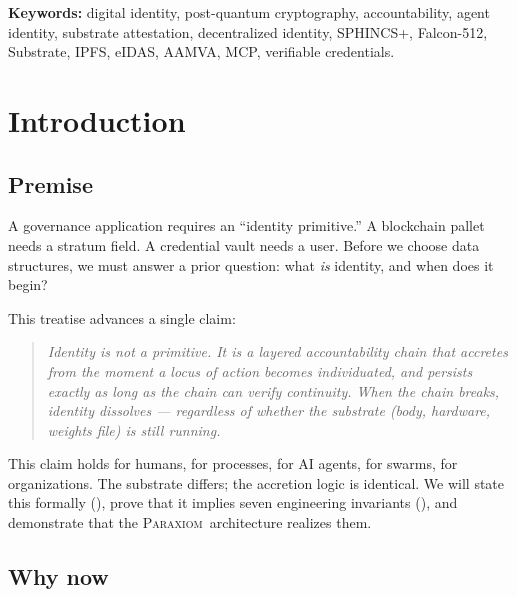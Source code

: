 \documentclass[11pt,a4paper,parskip=half-,DIV=12,headings=standardclasses]{scrartcl}
\theoremstyle{ncthm}
\theoremstyle{ncdef}
\newcommand{\paraxiom}{\textsc{Paraxiom}}
\begin{document}
\bigskip
\noindent\textbf{Keywords:}\;
digital identity, post-quantum cryptography, accountability,
agent identity, substrate attestation, decentralized identity,
SPHINCS+, Falcon-512, Substrate, IPFS, eIDAS, AAMVA, MCP,
verifiable credentials.

\bigskip

\tableofcontents

\bigskip

\section{Introduction}

\subsection{Premise}

A governance application requires an ``identity primitive.'' A
blockchain pallet needs a stratum field. A credential vault needs a
user. Before we choose data structures, we must answer a prior
question: what \emph{is} identity, and when does it begin?

This treatise advances a single claim:

\begin{quote}
\itshape
Identity is not a primitive. It is a layered accountability chain
that accretes from the moment a locus of action becomes individuated,
and persists exactly as long as the chain can verify continuity.
When the chain breaks, identity dissolves --- regardless of whether
the substrate (body, hardware, weights file) is still running.
\end{quote}

This claim holds for humans, for processes, for AI agents, for swarms,
for organizations. The substrate differs; the accretion logic is
identical. We will state this formally
(), prove that it
implies seven engineering invariants
(),
and demonstrate that the \paraxiom\ architecture realizes them.

\subsection{Why now}
\end{document}
